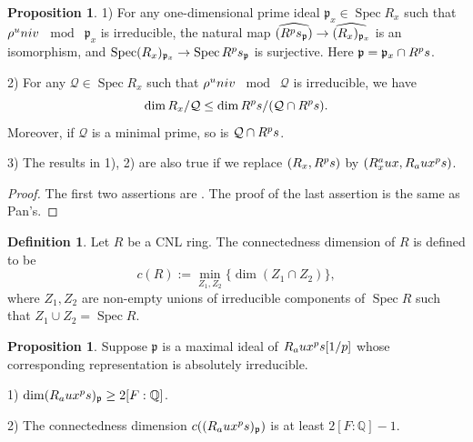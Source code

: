 \documentclass[12pt]{amsart}
\theoremstyle{plain}
\theoremstyle{definition}
\newtheorem{defn}[thm]{Definition}
\newtheorem{prop}[thm]{Proposition}
\theoremstyle{remark}
\begin{document}
\begin{prop}\label{pan}
	1) For any one-dimensional prime ideal $\mathfrak{p}_x \in \operatorname{Spec} R_x$ such that $\rho^\textnormal{univ} $~$\operatorname{mod} $~$\mathfrak{p}_x$ is irreducible, the natural map $\widehat{(R^\textnormal{ps}_{\mathfrak{p}})} \to \widehat{(R_x)_{\mathfrak{p}_x}}$ is an isomorphism, and $\operatorname{Spec}(R_x)_{\mathfrak{p}_x} \to \operatorname{Spec}R^\textnormal{ps}_{\mathfrak{p}}$ is surjective. Here $\mathfrak{p} = \mathfrak{p}_x \cap R^\textnormal{ps}$.
	
	2) For any $\mathcal{Q} \in \operatorname{Spec} R_x $ such that $\rho^\textnormal{univ} $~$\operatorname{mod} $~$\mathcal{Q}$ is irreducible, we have $$
	\operatorname{dim} R_x/\mathcal{Q} \le \operatorname{dim} R^\textnormal{ps}/ (\mathcal{Q} \cap R^\textnormal{ps}).$$ Moreover, if $\mathcal{Q}$ is a minimal prime, so is $\mathcal{Q} \cap R^\textnormal{ps}$.
	
	3) The results in 1), 2) are also true if we replace $(R_x, R^\textnormal{ps} )$ by $ (R_x^\textnormal{aux}, R_\textnormal{aux}^\textnormal{ps})$.
	
\end{prop}

\begin{proof}
	The first two assertions are \cite[Corollary 2.3.6]{pan2022fontaine}. The proof of the last assertion is the same as Pan's.
	
\end{proof}

\begin{defn} \cite[Definition 5.4.3]{pan2022fontaine}
	Let $R$ be a CNL ring. The connectedness dimension of $R$ is defined to be 
	$$c(R):=\min_{Z_1,Z_2}\{\dim (Z_1\cap Z_2)\}, $$
	where $Z_1,Z_2$ are non-empty unions of irreducible components of $\operatorname{Spec} R$ such that $Z_1\cup Z_2=\operatorname{Spec} R$.
\end{defn}

\begin{prop}\label{connect dim} Suppose $ \mathfrak{p}$ is a maximal ideal of $R_\textnormal{aux}^\textnormal{ps}[1/p]$ whose corresponding representation is absolutely irreducible.
	
	1) $\operatorname{dim}  (R_\textnormal{aux}^\textnormal{ps})_\mathfrak{p} \ge 2[F: \mathbb{Q}]$.
	
	2) The connectedness dimension $c((R_\textnormal{aux}^\textnormal{ps})_\mathfrak{p})$ is at least $2[F: \mathbb{Q}]-1$.
\end{prop}
\end{document}
